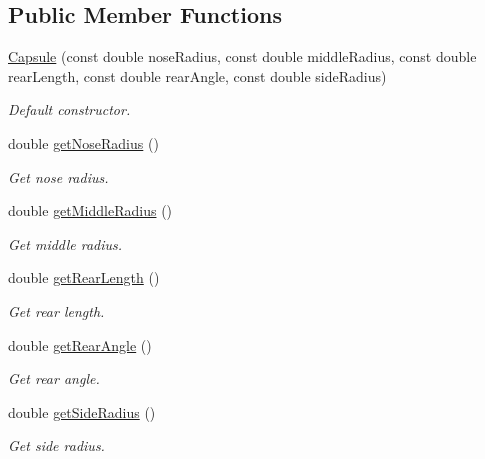 \subsection*{Public Member Functions}
\begin{DoxyCompactItemize}
\item 
\hyperlink{classtudat_1_1geometric__shapes_1_1Capsule_a529cff791e66aac5f64aa70f3b186f38}{Capsule} (const double nose\+Radius, const double middle\+Radius, const double rear\+Length, const double rear\+Angle, const double side\+Radius)
\begin{DoxyCompactList}\small\item\em Default constructor. \end{DoxyCompactList}\item 
double \hyperlink{classtudat_1_1geometric__shapes_1_1Capsule_a8300cfbdd73fc688163ea0115f332a16}{get\+Nose\+Radius} ()
\begin{DoxyCompactList}\small\item\em Get nose radius. \end{DoxyCompactList}\item 
double \hyperlink{classtudat_1_1geometric__shapes_1_1Capsule_a4a1659bd546cf5ddb3636be2d18f1f29}{get\+Middle\+Radius} ()
\begin{DoxyCompactList}\small\item\em Get middle radius. \end{DoxyCompactList}\item 
double \hyperlink{classtudat_1_1geometric__shapes_1_1Capsule_a947cd251361985f91b1e2dbae119eaab}{get\+Rear\+Length} ()
\begin{DoxyCompactList}\small\item\em Get rear length. \end{DoxyCompactList}\item 
double \hyperlink{classtudat_1_1geometric__shapes_1_1Capsule_a287f10b2ce3d889084f7de6f7c969362}{get\+Rear\+Angle} ()
\begin{DoxyCompactList}\small\item\em Get rear angle. \end{DoxyCompactList}\item 
double \hyperlink{classtudat_1_1geometric__shapes_1_1Capsule_a5e1731119ebfe256224cee1c998b2cd2}{get\+Side\+Radius} ()
\begin{DoxyCompactList}\small\item\em Get side radius. \end{DoxyCompactList}\end{DoxyCompactItemize}
